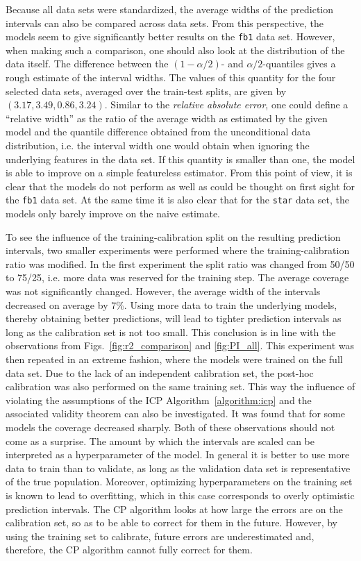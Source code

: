 \documentclass[smallcondensed]{svjour3}
\begin{document}
    Because all data sets were standardized, the average widths of the prediction intervals can also be compared across data sets. From this perspective, the models seem to give significantly better results on the \texttt{fb1} data set. However, when making such a comparison, one should also look at the distribution of the data itself. The difference between the $(1-\alpha/2)$- and $\alpha/2$-quantiles gives a rough estimate of the interval widths. The values of this quantity for the four selected data sets, averaged over the train-test splits, are given by $(3.17, 3.49, 0.86, 3.24)$. Similar to the \textit{relative absolute error}, one could define a ``relative width'' as the ratio of the average width as estimated by the given model and the quantile difference obtained from the unconditional data distribution, i.e. the interval width one would obtain when ignoring the underlying features in the data set. If this quantity is smaller than one, the model is able to improve on a simple featureless estimator. From this point of view, it is clear that the models do not perform as well as could be thought on first sight for the \texttt{fb1} data set. At the same time it is also clear that for the \texttt{star} data set, the models only barely improve on the naive estimate.

    To see the influence of the training-calibration split on the resulting prediction intervals, two smaller experiments were performed where the training-calibration ratio was modified. In the first experiment the split ratio was changed from 50/50 to 75/25, i.e. more data was reserved for the training step. The average coverage was not significantly changed. However, the average width of the intervals decreased on average by 7\%. Using more data to train the underlying models, thereby obtaining better predictions, will lead to tighter prediction intervals as long as the calibration set is not too small. This conclusion is in line with the observations from Figs.~\ref{fig:r2_comparison} and \ref{fig:PI_all}. This experiment was then repeated in an extreme fashion, where the models were trained on the full data set. Due to the lack of an independent calibration set, the post-hoc calibration was also performed on the same training set. This way the influence of violating the assumptions of the ICP Algorithm~\ref{algorithm:icp} and the associated validity theorem can also be investigated. It was found that for some models the coverage decreased sharply. Both of these observations should not come as a surprise. The amount by which the intervals are scaled can be interpreted as a hyperparameter of the model. In general it is better to use more data to train than to validate, as long as the validation data set is representative of the true population. Moreover, optimizing hyperparameters on the training set is known to lead to overfitting, which in this case corresponds to overly optimistic prediction intervals. The CP algorithm looks at how large the errors are on the calibration set, so as to be able to correct for them in the future. However, by using the training set to calibrate, future errors are underestimated and, therefore, the CP algorithm cannot fully correct for them.
\end{document}

